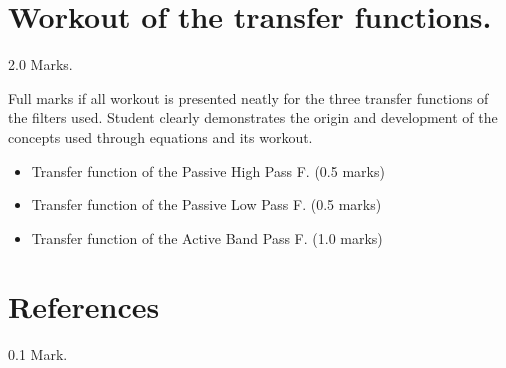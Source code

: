 \documentclass[journal]{IEEEtran}
\begin{document}
\appendices
\section{Workout of the transfer functions.}
\begin{flushright} 2.0 Marks. \end{flushright}
Full marks if all workout is presented neatly for the three transfer functions of the filters used. Student clearly demonstrates the origin and development of the concepts used through equations and its workout.
\begin{itemize}

    \item  Transfer function of the Passive High Pass F. (0.5 marks)
    \item Transfer function of the Passive Low Pass F. (0.5 marks)
    \item  Transfer function of the Active Band Pass F. (1.0 marks)

\end{itemize}


%
%
%


\printbibliography

\section*{References}
\begin{flushright} 0.1 Mark. \end{flushright}
\end{document}
